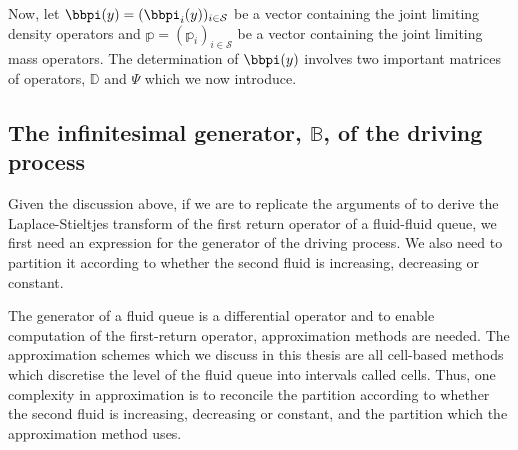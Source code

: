 Now, let ${{\bbpi}}(y) = ( \bbpi_i(y))_{i \in \mathcal{S}}$ be a vector containing the joint limiting density operators and ${\mathbb{p}} = ( {\mathbb p}_i)_{i \in \mathcal{S}}$ be a vector containing the joint limiting mass operators. The determination of ${{\bbpi}}(y)$ involves two important matrices of operators, $ {\mathbb D}$ and $ {\mathbb \Psi}$ which we now introduce. %

\subsection{The infinitesimal generator, \(\mathbb B\), of the driving process}
Given the discussion above, if we are to replicate the arguments of \cite{bean2005} to derive the Laplace-Stieltjes transform of the first return operator of a fluid-fluid queue, we first need an expression for the generator of the driving process. We also need to partition it according to whether the second fluid is increasing, decreasing or constant. 

The generator of a fluid queue is a differential operator and to enable computation of the first-return operator, approximation methods are needed. The approximation schemes which we discuss in this thesis are all cell-based methods which discretise the level of the fluid queue into intervals called cells. Thus, one complexity in approximation is to reconcile the partition according to whether the second fluid is increasing, decreasing or constant, and the partition which the approximation method uses. %

\label{subsec:B_operators}
